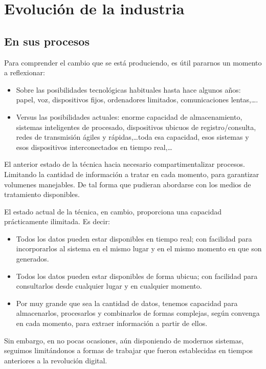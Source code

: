 \documentclass[spanish,12pt,a4paper,final,oneside]{book}
\begin{document}
\section{Evolución de la industria}


\subsection{En sus procesos}
Para comprender el cambio que se está produciendo, es útil pararnos un momento a reflexionar:
\begin{itemize}
\item Sobre las posibilidades tecnológicas habituales hasta hace algunos años: papel, voz, dispositivos fijos, ordenadores limitados, comunicaciones lentas,\ldots.
\item Versus las posibilidades actuales: enorme capacidad de almacenamiento, sistemas inteligentes de procesado, dispositivos ubicuos de registro/consulta, redes de transmisión ágiles y rápidas,\ldots toda esa capacidad, esos  sistemas y esos dispositivos interconectados en tiempo real,\ldots
\end{itemize}

El anterior estado de la técnica hacia necesario compartimentalizar procesos. Limitando la cantidad de información a tratar en cada momento, para garantizar volumenes manejables. De tal forma que pudieran abordarse con los medios de tratamiento disponibles.

El estado actual de la técnica, en cambio, proporciona una capacidad prácticamente ilimitada. Es decir:
\begin{itemize}
\item Todos los datos pueden estar disponibles en tiempo real; con facilidad para incorporarlos al sistema en el mismo lugar y en el mismo momento en que son generados.
\item Todos los datos pueden estar disponibles de forma ubicua; con facilidad para consultarlos desde cualquier lugar y en cualquier momento.
\item Por muy grande que sea la cantidad de datos, tenemos capacidad para almacenarlos, procesarlos y combinarlos de formas complejas, según convenga en cada momento, para extraer información a partir de ellos.
\end{itemize}

Sin embargo, en no pocas ocasiones, aún disponiendo de modernos sistemas, seguimos limitándonos a formas de trabajar que fueron establecidas en tiempos anteriores a la revolución digital. 
\end{document}
